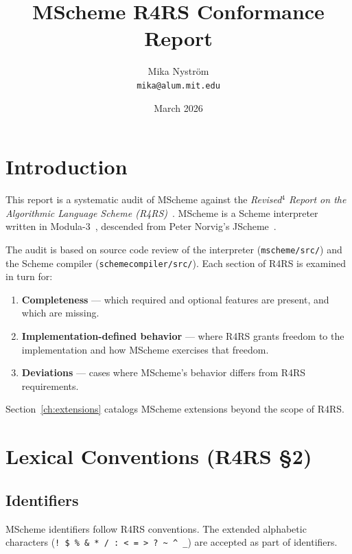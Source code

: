 \documentclass[12pt]{report}
\title{\bfseries\sffamily\fontsize{24.88}{30}\selectfont
  MScheme R4RS Conformance Report}
\author{Mika Nystr\"om \\ {\tt mika@alum.mit.edu}}
\date{March 2026}
\begin{document}
\maketitle
\thispagestyle{empty}

\newpage
\tableofcontents
\newpage

\chapter{Introduction}

This report is a systematic audit of MScheme against the
\emph{Revised$^4$ Report on the Algorithmic Language Scheme
(R4RS)}~\cite{r4rs}.  MScheme is a Scheme interpreter written in
Modula-3~\cite{spwm3}, descended from Peter Norvig's
JScheme~\cite{jscheme}.

The audit is based on source code review of the interpreter
({\tt mscheme/src/}) and the Scheme compiler
({\tt schemecompiler/src/}).  Each section of R4RS is examined
in turn for:

\begin{enumerate}
\item \textbf{Completeness} --- which required and optional features
  are present, and which are missing.
\item \textbf{Implementation-defined behavior} --- where R4RS grants
  freedom to the implementation and how MScheme exercises that freedom.
\item \textbf{Deviations} --- cases where MScheme's behavior differs
  from R4RS requirements.
\end{enumerate}

Section~\ref{ch:extensions} catalogs MScheme extensions beyond the
scope of R4RS.

\chapter{Lexical Conventions (R4RS \S2)}

\section{Identifiers}

MScheme identifiers follow R4RS conventions.  The extended alphabetic
characters ({\tt !\ \$\ \%\ \&\ *\ /\ :\ <\ =\ >\ ?\ \textasciitilde\
\textasciicircum\ \_}) are accepted as part of identifiers.
\end{document}
